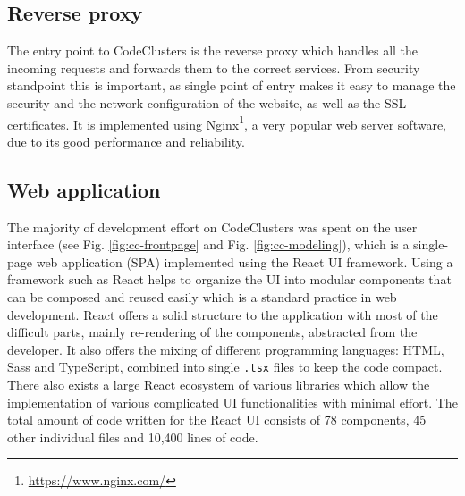 \subsection{Reverse proxy}

The entry point to CodeClusters is the reverse proxy which handles all the incoming requests and forwards them to the correct services. From security standpoint this is important, as single point of entry makes it easy to manage the security and the network configuration of the website, as well as the SSL certificates. It is implemented using Nginx\footnote{\url{https://www.nginx.com/}}, a very popular web server software, due to its good performance and reliability.

\subsection{Web application}

The majority of development effort on CodeClusters was spent on the user interface (see Fig. \ref{fig:cc-frontpage} and Fig. \ref{fig:cc-modeling}), which is a single-page web application (SPA) implemented using the React UI framework. Using a framework such as React helps to organize the UI into modular components that can be composed and reused easily which is a standard practice in web development. React offers a solid structure to the application with most of the difficult parts, mainly re-rendering of the components, abstracted from the developer. It also offers the mixing of different programming languages: HTML, Sass and TypeScript, combined into single \texttt{.tsx} files to keep the code compact. There also exists a large React ecosystem of various libraries which allow the implementation of various complicated UI functionalities with minimal effort. The total amount of code written for the React UI consists of 78 components, 45 other individual files and 10,400 lines of code.

